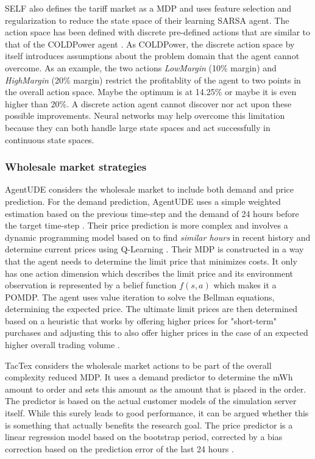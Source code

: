 \ac{SELF} also defines the tariff market as a \ac{MDP} and uses feature selection and regularization to reduce the state
space of their learning \ac{SARSA} agent. The action space has been defined with discrete pre-defined actions that are
similar to that of the COLDPower agent \cite[]{peters2013reinforcement}. As COLDPower, the discrete action space by itself introduces assumptions about
the problem domain that the agent cannot overcome. As an example, the two actions \emph{LowMargin} (10\% margin) and
\emph{HighMargin} (20\% margin) restrict the profitablity of the agent to two points in the overall action space. Maybe
the optimum is at 14.25\% or maybe it is even higher than 20\%. A discrete action agent cannot discover nor act upon
these possible improvements. Neural networks may help overcome this limitation because they can both handle large state spaces
and act successfully in continuous state spaces.



\subsubsection{Wholesale market strategies}%
\label{ssub:wholesale_market_strategies}


AgentUDE considers the wholesale market to include both demand and price prediction. For the demand prediction, AgentUDE
uses a simple weighted estimation based on the previous time-step and the demand of 24 hours before the target time-step
\cite[]{ozdemir2015winner}. Their price prediction is more complex and involves a dynamic programming model based on
\cite[]{tesauro2002strategic} to find \emph{similar hours} in recent history and determine current prices using
Q-Learning \cite[]{ozdemir2017strategy}. Their \ac{MDP} is constructed in a way that the agent needs to determine the
limit price that minimizes costs. It only has one action dimension which describes the limit price and its environment
observation is represented by a belief function $f(s,a)$ which makes it a \ac{POMDP}. The agent uses value iteration to
solve the Bellman equations, determining the expected price. The ultimate limit prices are then determined based on a
heuristic that works by offering higher prices for "short-term" purchases and adjusting this to also offer higher prices
in the case of an expected higher overall trading volume \cite[]{ozdemir2017strategy}.

TacTex considers the wholesale market actions to be part of the overall complexity reduced \ac{MDP}. It uses a demand
predictor to determine the \ac{mWh} amount to order and sets this amount as the amount that is placed in the order. The
predictor is based on the actual customer models of the simulation server itself. While this surely leads to good
performance, it can be argued whether this is something that actually benefits the research goal. The price predictor is
a linear regression model based on the bootstrap period, corrected by a bias correction based on the prediction error of
the last 24 hours \cite[]{tactexurieli2016mdp}.


